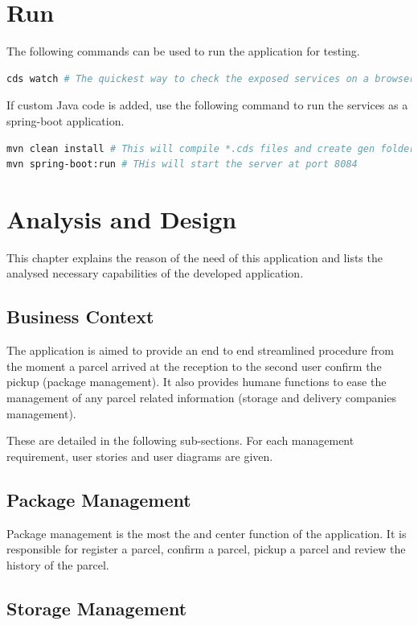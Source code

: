\section{Run}
The following commands can be used to run the application for testing.

\begin{lstlisting}[language={bash}]
cds watch # The quickest way to check the exposed services on a browser.
\end{lstlisting}

If custom Java code is added, use the following command to run the services as a spring-boot application.
\begin{lstlisting}[language={bash}]
mvn clean install # This will compile *.cds files and create gen folder.
mvn spring-boot:run # THis will start the server at port 8084
\end{lstlisting}


\section{Analysis and Design}

This chapter explains the reason of the need of this application and lists the analysed necessary capabilities of the developed application.

\subsection{Business Context}
The application is aimed to provide an end to end streamlined procedure from the moment a parcel arrived at the reception to the second user confirm the pickup (package management). It also provides humane functions to ease the management of any parcel related information (storage and delivery companies management).

These are detailed in the following sub-sections. For each management requirement, user stories and user diagrams are given.

\subsection{Package Management}
Package management is the most the and center function of the application. It is responsible for register a parcel, confirm a parcel, pickup a parcel and review the history of the parcel.



\subsection{Storage Management}

